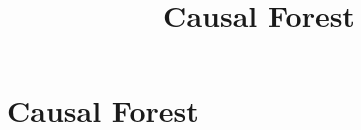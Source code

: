 \documentclass[hyperref={pdfpagelabels=false}]{beamer}
\begin{document}








\title[]
{Causal Forest}

\subtitle{}
\author{}
\institute{}
\date{}

\begin{frame}{}
  \titlepage
\end{frame}

\section{Causal Forest}
\end{document}

